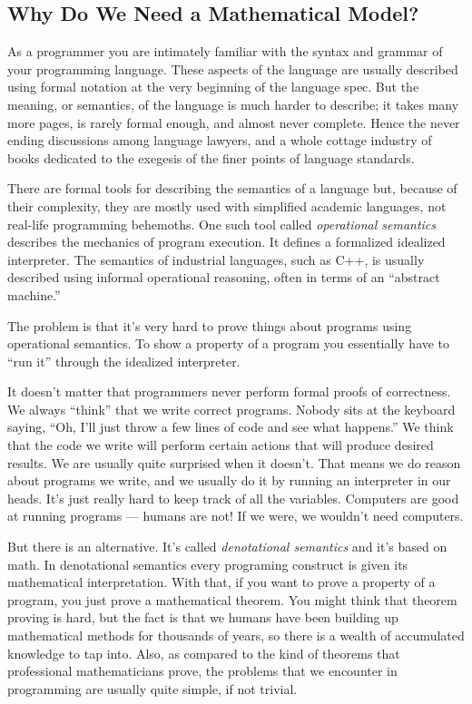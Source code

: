 \subsection{Why Do We Need a Mathematical
Model?}\label{why-do-we-need-a-mathematical-model}

As a programmer you are intimately familiar with the syntax and grammar
of your programming language. These aspects of the language are usually
described using formal notation at the very beginning of the language
spec. But the meaning, or semantics, of the language is much harder to
describe; it takes many more pages, is rarely formal enough, and almost
never complete. Hence the never ending discussions among language
lawyers, and a whole cottage industry of books dedicated to the exegesis
of the finer points of language standards.

There are formal tools for describing the semantics of a language but,
because of their complexity, they are mostly used with simplified
academic languages, not real-life programming behemoths. One such tool
called \emph{operational semantics} describes the mechanics of program
execution. It defines a formalized idealized interpreter. The semantics
of industrial languages, such as C++, is usually described using
informal operational reasoning, often in terms of an ``abstract
machine.''

The problem is that it's very hard to prove things about programs using
operational semantics. To show a property of a program you essentially
have to ``run it'' through the idealized interpreter.

It doesn't matter that programmers never perform formal proofs of
correctness. We always ``think'' that we write correct programs. Nobody
sits at the keyboard saying, ``Oh, I'll just throw a few lines of code
and see what happens.'' We think that the code we write will perform
certain actions that will produce desired results. We are usually quite
surprised when it doesn't. That means we do reason about programs we
write, and we usually do it by running an interpreter in our heads. It's
just really hard to keep track of all the variables. Computers are good
at running programs --- humans are not! If we were, we wouldn't need
computers.

But there is an alternative. It's called \emph{denotational semantics}
and it's based on math. In denotational semantics every programing
construct is given its mathematical interpretation. With that, if you
want to prove a property of a program, you just prove a mathematical
theorem. You might think that theorem proving is hard, but the fact is
that we humans have been building up mathematical methods for thousands
of years, so there is a wealth of accumulated knowledge to tap into.
Also, as compared to the kind of theorems that professional
mathematicians prove, the problems that we encounter in programming are
usually quite simple, if not trivial.

